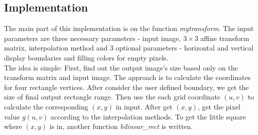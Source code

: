 \subsection{Implementation}
The main part of this implementation is on the function \emph{mytransform}. The input parameters are three necessary parameters - input image, $3\times 3$ affine transform matrix, interpolation method and 3 optional parameters - horizontal and vertical display boundaries and filling colors for empty pixels. \\

The idea is simple: First, find out the output image's size based only on the transform matrix and input image. The approach is to calculate the coordinates for four rectangle vertices. After consider the user defined boundary, we get the size of final output rectangle range. Then use the each grid coordinate $(u,v)$ to calculate the corresponding $(x,y)$ in input. After get $(x,y)$, get the pixel value $g(u,v)$ according to the interpolation methods. To get the little square where $(x,y)$ is in, another function \emph{bilinear\_rect} is written.\\

